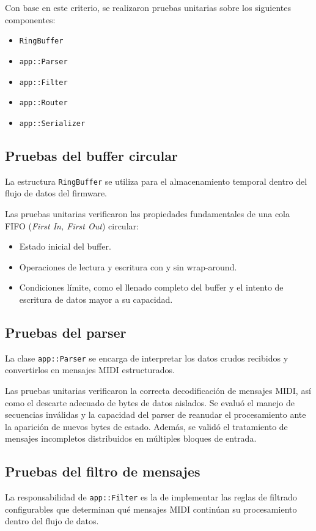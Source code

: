 Con base en este criterio, se realizaron pruebas unitarias sobre los siguientes componentes:
\begin{itemize}
	\item \texttt{RingBuffer}
	\item \texttt{app::Parser}
	\item \texttt{app::Filter}
	\item \texttt{app::Router}
	\item \texttt{app::Serializer}
\end{itemize}

\subsection{Pruebas del buffer circular}
La estructura \texttt{RingBuffer} se utiliza para el almacenamiento temporal dentro del flujo de datos del firmware.

Las pruebas unitarias verificaron las propiedades fundamentales de una cola FIFO (\textit{First In, First Out}) circular:
\begin{itemize}
	\item Estado inicial del buffer.
	\item Operaciones de lectura y escritura con y sin wrap-around.
	\item Condiciones límite, como el llenado completo del buffer y el intento de escritura de datos mayor a su capacidad.
\end{itemize}

\subsection{Pruebas del parser}
La clase \texttt{app::Parser} se encarga de interpretar los datos crudos recibidos y convertirlos en mensajes MIDI estructurados.

Las pruebas unitarias verificaron la correcta decodificación de mensajes MIDI, así como el descarte adecuado de bytes de datos aislados. Se evaluó el manejo de secuencias inválidas y la capacidad del parser de reanudar el procesamiento ante la aparición de nuevos bytes de estado. Además, se validó el tratamiento de mensajes incompletos distribuidos en múltiples bloques de entrada.

\subsection{Pruebas del filtro de mensajes}
La responsabilidad de \texttt{app::Filter} es la de implementar las reglas de filtrado configurables que determinan qué mensajes MIDI continúan su procesamiento dentro del flujo de datos.

